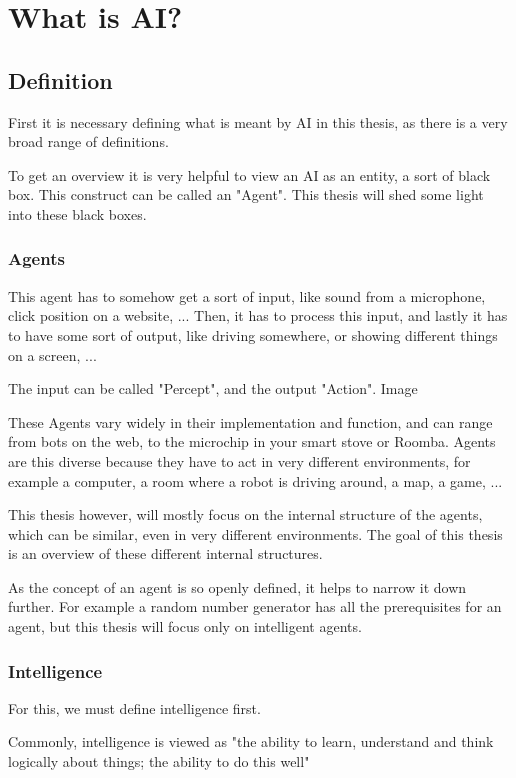 \chapter{What is AI?}
\section{Definition}
First it is necessary defining what is meant by AI in this thesis, as there is a very broad range of definitions.%

To get an overview it is very helpful to view an AI as an entity, a sort of black box. This construct can be called an "Agent". 
This thesis will shed some light into these black boxes.

\subsection{Agents}
This agent has to somehow get a sort of input, like sound from a microphone, click position on a website, ... 
Then, it has to process this input, 
and lastly it has to have some sort of output, like driving somewhere, or showing different things on a screen, ... 

The input can be called "Percept", and the output "Action". %
Image

These Agents vary widely in their implementation and function, and can range from bots on the web, to the microchip in your smart stove or Roomba. 
Agents are this diverse because they have to act in very different environments, for example a computer, a room where a robot is driving around, a map, a game, ...

This thesis however, will mostly focus on the internal structure of the agents, which can be similar, even in very different environments.
The goal of this thesis is an overview of these different internal structures.

As the concept of an agent is so openly defined, it helps to narrow it down further. For example a random number generator has all the prerequisites for an agent, but this thesis will focus only on intelligent agents.

\subsection{Intelligence}
For this, we must define intelligence first.

Commonly, intelligence is viewed as "the ability to learn, understand and think logically about things; the ability to do this well" 

